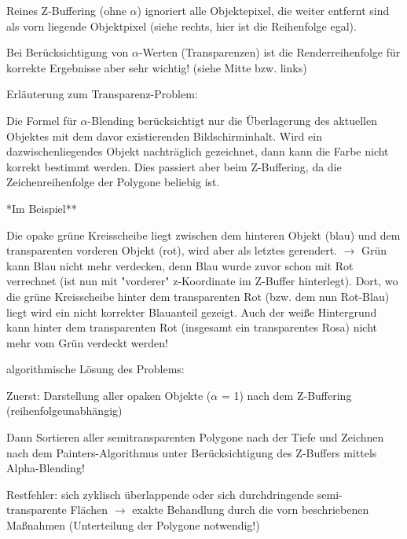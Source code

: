 \documentclass[landscape]{article}
\begin{document}
\begin{multicols}{3}
  
  \begin{itemize*}
    \item Reines Z-Buffering (ohne $\alpha$) ignoriert alle Objektepixel, die weiter entfernt sind als vorn liegende Objektpixel (siehe rechts, hier ist die Reihenfolge egal).
    \item Bei Berücksichtigung von $\alpha$-Werten (Transparenzen) ist die Renderreihenfolge für korrekte Ergebnisse aber sehr wichtig! (siehe Mitte bzw. links)
    \item Erläuterung zum Transparenz-Problem:
    \item Die Formel für $\alpha$-Blending berücksichtigt nur die Überlagerung des aktuellen Objektes mit dem davor existierenden Bildschirminhalt. Wird ein dazwischenliegendes Objekt nachträglich gezeichnet, dann kann die Farbe nicht korrekt bestimmt werden. Dies passiert aber beim Z-Buffering, da die Zeichenreihenfolge der Polygone beliebig ist.
    \item **Im Beispiel**
    \item Die opake grüne Kreisscheibe liegt zwischen dem hinteren Objekt (blau) und dem transparenten vorderen Objekt (rot), wird aber als letztes gerendert. $\rightarrow$ Grün kann Blau nicht mehr verdecken, denn Blau wurde zuvor schon mit Rot verrechnet (ist nun mit "vorderer" z-Koordinate im Z-Buffer hinterlegt). Dort, wo die grüne Kreisscheibe hinter dem transparenten Rot (bzw. dem nun Rot-Blau) liegt wird ein nicht korrekter Blauanteil gezeigt. Auch der weiße Hintergrund kann hinter dem transparenten Rot (insgesamt ein transparentes Rosa) nicht mehr vom Grün verdeckt werden!
    \item algorithmische Lösung des Problems:
    \item Zuerst: Darstellung aller opaken Objekte ($\alpha$ = 1) nach dem Z-Buffering (reihenfolgeunabhängig)
    \item Dann Sortieren aller semitransparenten Polygone nach der Tiefe und Zeichnen nach dem Painters-Algorithmus unter Berücksichtigung des Z-Buffers mittels Alpha-Blending!
    \item Restfehler: sich zyklisch überlappende oder sich durchdringende semi-transparente Flächen $\rightarrow$ exakte Behandlung durch die vorn beschriebenen Maßnahmen (Unterteilung der Polygone notwendig!)
  \end{itemize*}
  

\end{multicols}
\end{document}
